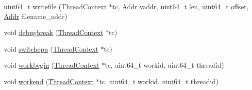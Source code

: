 \begin{DoxyCompactItemize}
\item 
uint64\_\-t \hyperlink{namespacePseudoInst_a719365f98235b44f6b4593985ece3f11}{writefile} (\hyperlink{classThreadContext}{ThreadContext} $\ast$tc, \hyperlink{base_2types_8hh_af1bb03d6a4ee096394a6749f0a169232}{Addr} vaddr, uint64\_\-t len, uint64\_\-t offset, \hyperlink{base_2types_8hh_af1bb03d6a4ee096394a6749f0a169232}{Addr} filename\_\-addr)
\item 
void \hyperlink{namespacePseudoInst_a443ca28fda37e0c3211abfc3d41fd999}{debugbreak} (\hyperlink{classThreadContext}{ThreadContext} $\ast$tc)
\item 
void \hyperlink{namespacePseudoInst_aaf5643633dadf53cc203e80bd0b54ba6}{switchcpu} (\hyperlink{classThreadContext}{ThreadContext} $\ast$tc)
\item 
void \hyperlink{namespacePseudoInst_ac883da99bdbd438ad5d32a58f60769e9}{workbegin} (\hyperlink{classThreadContext}{ThreadContext} $\ast$tc, uint64\_\-t workid, uint64\_\-t threadid)
\item 
void \hyperlink{namespacePseudoInst_ad5ecc2000334e8354f226e01727824a0}{workend} (\hyperlink{classThreadContext}{ThreadContext} $\ast$tc, uint64\_\-t workid, uint64\_\-t threadid)
\end{DoxyCompactItemize}


